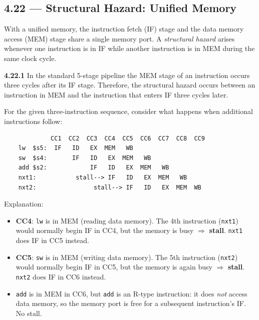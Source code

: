 \subsection*{4.22 --- Structural Hazard: Unified Memory}
\hypertarget{sol-4.22}{}

With a unified memory, the instruction fetch (IF) stage and the data memory
access (MEM) stage share a single memory port.  A \emph{structural hazard}
arises whenever one instruction is in IF while another instruction is in MEM
during the same clock cycle.

\medskip\noindent\textbf{4.22.1}
In the standard 5-stage pipeline the MEM stage of an instruction occurs three
cycles after its IF stage.  Therefore, the structural hazard occurs between
an instruction in MEM and the instruction that enters IF three cycles later.

For the given three-instruction sequence, consider what happens when
additional instructions follow:

\begin{verbatim}
             CC1  CC2  CC3  CC4  CC5  CC6  CC7  CC8  CC9
    lw  $s5:  IF   ID   EX  MEM   WB
    sw  $s4:       IF   ID   EX  MEM   WB
    add $s2:            IF   ID   EX  MEM   WB
    nxt1:           stall--> IF   ID   EX  MEM   WB
    nxt2:                stall--> IF   ID   EX  MEM  WB
\end{verbatim}

\noindent Explanation:
\begin{itemize}
  \item \textbf{CC4}: \texttt{lw} is in MEM (reading data memory).  The 4th
        instruction (\texttt{nxt1}) would normally begin IF in CC4, but the
        memory is busy $\Rightarrow$ \textbf{stall}.  \texttt{nxt1} does IF in
        CC5 instead.
  \item \textbf{CC5}: \texttt{sw} is in MEM (writing data memory).  The 5th
        instruction (\texttt{nxt2}) would normally begin IF in CC5, but the
        memory is again busy $\Rightarrow$ \textbf{stall}.  \texttt{nxt2} does
        IF in CC6 instead.
  \item \texttt{add} is in MEM in CC6, but \texttt{add} is an R-type
        instruction: it does \emph{not} access data memory, so the memory port
        is free for a subsequent instruction's IF.  No stall.
\end{itemize}

